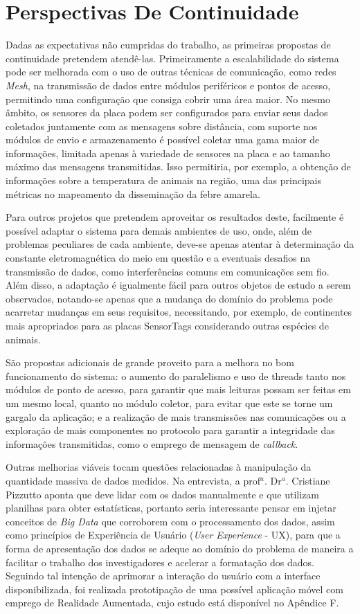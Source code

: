 \section{Perspectivas De Continuidade}

Dadas as expectativas não cumpridas do trabalho, as primeiras propostas de continuidade pretendem atendê-las. Primeiramente a escalabilidade do sistema pode ser melhorada com o uso de outras técnicas de comunicação, como redes \emph{Mesh}, na transmissão de dados entre módulos periféricos e pontos de acesso, permitindo uma configuração que consiga cobrir uma área maior. No mesmo âmbito, os sensores da placa podem ser configurados para enviar seus dados coletados juntamente com as mensagens sobre distância, com suporte nos módulos de envio e armazenamento é possível coletar uma gama maior de informações, limitada apenas à variedade de sensores na placa e ao tamanho máximo das mensagens transmitidas. Isso permitiria, por exemplo, a obtenção de informações sobre a temperatura de animais na região, uma das principais métricas no mapeamento da disseminação da febre amarela.

Para outros projetos que pretendem aproveitar os resultados deste, facilmente é possível adaptar o sistema para demais ambientes de uso, onde, além de problemas peculiares de cada ambiente, deve-se apenas atentar à determinação da constante eletromagnética do meio em questão e a eventuais desafios na transmissão de dados, como interferências comuns em comunicações sem fio. Além disso, a adaptação é igualmente fácil para outros objetos de estudo a serem observados, notando-se apenas que a mudança do domínio do problema pode acarretar mudanças em seus requisitos, necessitando, por exemplo, de continentes mais apropriados para as placas SensorTags considerando outras espécies de animais.

São propostas adicionais de grande proveito para a melhora no bom funcionamento do sistema: o aumento do paralelismo e uso de threads tanto nos módulos de ponto de acesso, para garantir que mais leituras possam ser feitas em um mesmo local, quanto no módulo coletor, para evitar que este se torne um gargalo da aplicação; e a realização de mais transmissões nas comunicações ou a exploração de mais componentes no protocolo para garantir a integridade das informações transmitidas, como o emprego de mensagem de \emph{callback}.

Outras melhorias viáveis tocam questões relacionadas à manipulação da quantidade massiva de dados medidos. Na entrevista, a prof$^a$. Dr$^a$. Cristiane Pizzutto aponta que deve lidar com os dados manualmente e que utilizam planilhas para obter estatísticas, portanto seria interessante pensar em injetar conceitos de \emph{Big Data} que corroborem com o processamento dos dados, assim como princípios de Experiência de Usuário (\emph{User Experience} - UX), para que a forma de apresentação dos dados se adeque ao domínio do problema de maneira a facilitar o trabalho dos investigadores e acelerar a formatação dos dados. Seguindo tal intenção de aprimorar a interação do usuário com a interface disponibilizada, foi realizada prototipação de uma possível aplicação móvel com emprego de Realidade Aumentada, cujo estudo está disponível no Apêndice F.

